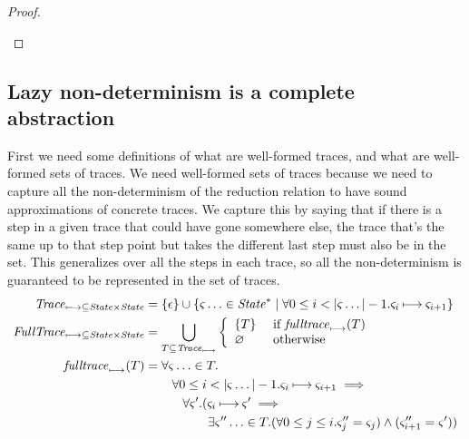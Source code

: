 \documentclass{llncs}
\begin{document}
{\begin{proof}
\begin{byCases}
\end{byCases}
\end{proof}
}
{
\subsection{Lazy non-determinism is a complete abstraction}

\newcommand{\Trace}{\mathit{Trace}}
\newcommand{\FullTrace}{\mathit{FullTrace}}
\newcommand{\fulltrace}{\mathit{fulltrace}}
\newcommand{\trunc}{\mathit{trunc}}

First we need some definitions of what are well-formed traces, and
what are well-formed sets of traces. We need well-formed sets of
traces because we need to capture all the non-determinism of the
reduction relation to have sound approximations of concrete traces. We
capture this by saying that if there is a step in a given trace that
could have gone somewhere else, the trace that's the same up to that
step point but takes the different last step must also be in the
set. This generalizes over all the steps in each trace, so all the
non-determinism is guaranteed to be represented in the set of traces.
\begin{align*}
\Trace_{\machstep \subseteq \State \times \State} &=
 \setof{\epsilon} \cup
 \setof{\mstate\ldots\in\State^* \mid \forall 0 \le i < |\mstate\ldots|-1. \mstate_i \machstep \mstate_{i+1}} \\
\FullTrace_{\machstep \subseteq \State \times \State} &=
 \bigcup\limits_{T \subseteq \Trace_{\machstep}}
    \left\{\begin{array}{ll}
            \setof{T} & \text{ if } \fulltrace_{\machstep}(T) \\
            \varnothing & \text{ otherwise}
           \end{array}\right. \\
\fulltrace_{\machstep}(T) &=
  \forall \mstate\ldots\in T. \\
  &\qquad\,\forall 0 \le i < |\mstate\ldots|-1.
     \mstate_i \machstep \mstate_{i+1} \implies \\
   &\qquad\quad\forall \mstate'.(\mstate_i \machstep \mstate' \implies \\
   &\qquad\qquad\quad
       \exists \mstate''\ldots \in T.
         (\forall 0 \le j \le i. \mstate''_j = \mstate_j) \wedge (\mstate''_{i+1} = \mstate')) \\
\end{align*}

}
\end{document}

